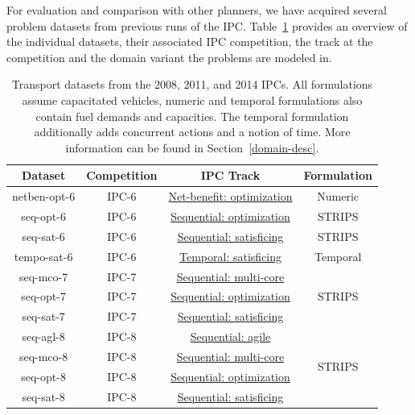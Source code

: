 For evaluation and comparison with other planners, we have acquired several problem datasets from previous runs of the IPC.
Table~\ref{tab:ipc-datasets} provides an overview of the individual datasets, their associated IPC competition, the track at the competition and the domain variant the problems are modeled in.

\begin{table}[tb]
\centering
\begin{tabular}{c||ccc}
\textbf{Dataset} & \textbf{Competition} & \textbf{IPC Track} & \textbf{Formulation} \\ 
\midrule
\midrule
netben-opt-6 & IPC-6 & \href{http://icaps-conference.org/ipc2008/deterministic/NetBenefitOptimization.html}{Net-benefit: optimization} & Numeric \\ 
seq-opt-6 & IPC-6 & \href{http://icaps-conference.org/ipc2008/deterministic/SequentialOptimization.html}{Sequential: optimization} & STRIPS \\ 
seq-sat-6 & IPC-6 & \href{http://icaps-conference.org/ipc2008/deterministic/SequentialSatisficing.html}{Sequential: satisficing} & STRIPS \\ 
tempo-sat-6 & IPC-6 & \href{http://icaps-conference.org/ipc2008/deterministic/TemporalSatisficing.html}{Temporal: satisficing} & Temporal \\ 
\midrule
seq-mco-7 & IPC-7 & \href{http://www.plg.inf.uc3m.es/ipc2011-deterministic/SequentialMulticore.html}{Sequential: multi-core} & \multirow{3}{*}{STRIPS} \\ 
seq-opt-7 & IPC-7 & \href{http://www.plg.inf.uc3m.es/ipc2011-deterministic/SequentialOptimization.html}{Sequential: optimization} &  \\ 
seq-sat-7 & IPC-7 & \href{http://www.plg.inf.uc3m.es/ipc2011-deterministic/SequentialSatisficing.html}{Sequential: satisficing} &  \\ 
\midrule
seq-agl-8 & IPC-8 & \href{https://helios.hud.ac.uk/scommv/IPC-14/seqagi.html}{Sequential: agile} & \multirow{4}{*}{STRIPS} \\ 
seq-mco-8 & IPC-8 & \href{https://helios.hud.ac.uk/scommv/IPC-14/seqmulti.html}{Sequential: multi-core} &  \\ 
seq-opt-8 & IPC-8 & \href{https://helios.hud.ac.uk/scommv/IPC-14/seqopt.html}{Sequential: optimization} &  \\ 
seq-sat-8 & IPC-8 & \href{https://helios.hud.ac.uk/scommv/IPC-14/seqsat.html}{Sequential: satisficing} &  \\ 
\end{tabular}
\caption[Transport datasets from the 2008, 2011, and 2014 IPCs.]{Transport datasets from the 2008, 2011, and 2014 IPCs. All formulations assume capacitated vehicles, numeric and temporal formulations also contain fuel demands and capacities. The temporal formulation additionally adds concurrent actions and a notion of time. More information can be found in Section~\ref{domain-desc}.}
\label{tab:ipc-datasets}
\end{table}

